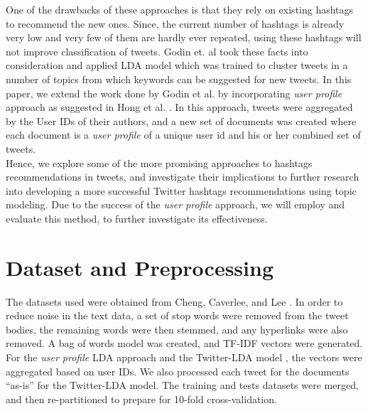 \documentclass{acm_proc_article-sp}
\begin{document}
\hspace*{5mm}One of the drawbacks of these approaches is that they rely on existing hashtags to recommend the new ones. Since, the current number of hashtags is already very low and very few of them are hardly ever repeated, using these hashtags will not improve classification of tweets. \cite{godin2013using} Godin et. al took these facts into consideration and applied LDA model which was trained to cluster tweets in a number of topics from which keywords can be suggested for new tweets. In this paper, we extend the work done by Godin et al.\cite{godin2013using} by incorporating \textit{user profile} approach as suggested in Hong et al. \cite{hong2010empirical}. In this approach, tweets were aggregated by the User IDs of their authors, and a new set of documents was created where each document is a \textit{user profile} of a unique user id and his or her combined set of tweets.\\
\hspace*{5mm}Hence, we explore some of the more promising approaches to hashtags recommendations in tweets, and investigate their implications to further research into developing a more successful Twitter hashtags recommendations using topic modeling. Due to the success of the \textit{user profile} approach, we will employ and evaluate this method, to further investigate its effectiveness.\\

\section{Dataset and Preprocessing}
\hspace*{5mm}The datasets used were obtained from Cheng, Caverlee, and Lee \cite{cheng2010content}. In order to reduce noise in the text data, a set of stop words were removed from the tweet bodies, the remaining words were then stemmed, and any hyperlinks were also removed. A bag of words model was created, and TF-IDF vectors were generated. For the \textit{user profile} LDA approach \cite{hong2010empirical} and the Twitter-LDA model \cite{zhao2011comparing}, the vectors were aggregated based on user IDs. We also processed each tweet for the documents ``as-is'' for the Twitter-LDA model. The training and tests datasets were merged, and then re-partitioned to prepare for 10-fold cross-validation.
\end{document}
